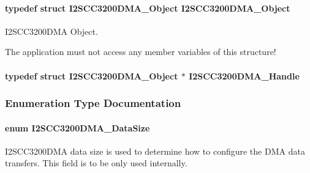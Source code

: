 \paragraph[{I2\+S\+C\+C3200\+D\+M\+A\+\_\+\+Object}]{\setlength{\rightskip}{0pt plus 5cm}typedef struct {\bf I2\+S\+C\+C3200\+D\+M\+A\+\_\+\+Object}  {\bf I2\+S\+C\+C3200\+D\+M\+A\+\_\+\+Object}}\label{_i2_s_c_c3200_d_m_a_8h_a3ee6e1f3af6d47f9d3f0fb4145789f9c}


I2\+S\+C\+C3200\+D\+M\+A Object. 

The application must not access any member variables of this structure! 
\paragraph[{I2\+S\+C\+C3200\+D\+M\+A\+\_\+\+Handle}]{\setlength{\rightskip}{0pt plus 5cm}typedef struct {\bf I2\+S\+C\+C3200\+D\+M\+A\+\_\+\+Object} $\ast$ {\bf I2\+S\+C\+C3200\+D\+M\+A\+\_\+\+Handle}}\label{_i2_s_c_c3200_d_m_a_8h_ab6238a057e94d1d1a22e8c8bee266872}


\subsubsection{Enumeration Type Documentation}
\paragraph[{I2\+S\+C\+C3200\+D\+M\+A\+\_\+\+Data\+Size}]{\setlength{\rightskip}{0pt plus 5cm}enum {\bf I2\+S\+C\+C3200\+D\+M\+A\+\_\+\+Data\+Size}}\label{_i2_s_c_c3200_d_m_a_8h_a712825340a80cc76e6ce4d6330ca3687}


I2\+S\+C\+C3200\+D\+M\+A data size is used to determine how to configure the D\+M\+A data transfers. This field is to be only used internally. 

